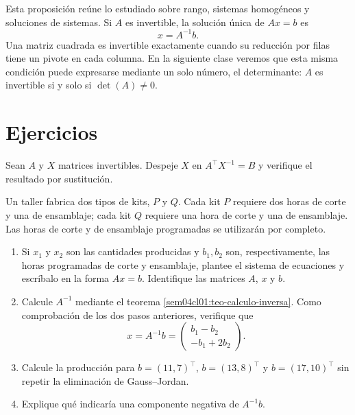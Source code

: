 \documentclass[compacto,10pt]{pubciencias-notas}
\begin{document}
Esta proposición reúne lo estudiado sobre rango, sistemas homogéneos y
soluciones de sistemas. Si $A$ es invertible, la solución única de $Ax=b$ es
\[
    x=A^{-1}b.
\]
Una matriz cuadrada es invertible exactamente cuando
su reducción por filas tiene un pivote en cada columna. En la siguiente clase
veremos que esta misma condición puede expresarse mediante un solo número, el determinante: $A$ es invertible si y solo si $\det(A)\ne0$.

\section{Ejercicios}

\begin{ejer}
    Sean $A$ y $X$ matrices invertibles. Despeje $X$ en
    $A^{\top}X^{-1}=B$ y verifique el resultado por sustitución.
\end{ejer}

\begin{ejer}
    Un taller fabrica dos tipos de kits, $P$ y $Q$. Cada kit $P$ requiere dos
    horas de corte y una de ensamblaje; cada kit $Q$ requiere una hora de corte
    y una de ensamblaje. Las horas de corte y de ensamblaje programadas se
    utilizarán por completo.
    \begin{enumerate}
        \item Si $x_1$ y $x_2$ son las cantidades producidas y $b_1,b_2$ son,
              respectivamente, las horas programadas de corte y ensamblaje,
              plantee el sistema de ecuaciones y escríbalo en la forma
              $Ax=b$. Identifique las matrices $A$, $x$ y $b$.
        \item Calcule $A^{-1}$ mediante el teorema
              \ref{sem04cl01:teo-calculo-inversa}. Como comprobación de los
              dos pasos anteriores, verifique que
              \[
                  x=A^{-1}b
                  =\begin{pmatrix}b_1-b_2\\-b_1+2b_2\end{pmatrix}.
              \]
        \item Calcule la producción para $b=(11,7)^{\top}$,
              $b=(13,8)^{\top}$ y $b=(17,10)^{\top}$ sin repetir la
              eliminación de Gauss--Jordan.
        \item Explique qué indicaría una componente negativa de $A^{-1}b$.
    \end{enumerate}
\end{ejer}
\end{document}

